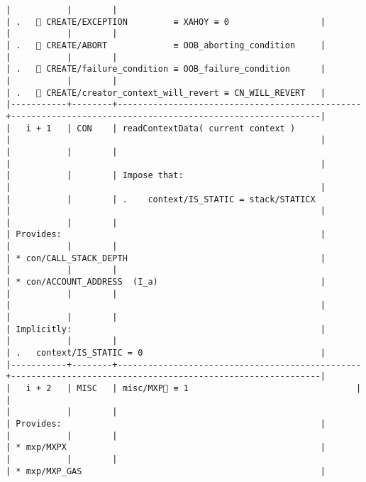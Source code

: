 \documentclass[varwidth=\maxdimen,margin=0.5cm,multi={verbatim}]{standalone}
\begin{document}
\begin{verbatim}
|           |        |                                                | .    CREATE/EXCEPTION         ≡ XAHOY ≡ 0                  |
|           |        |                                                | .    CREATE/ABORT             ≡ OOB_aborting_condition     |
|           |        |                                                | .    CREATE/failure_condition ≡ OOB_failure_condition      |
|           |        |                                                | .    CREATE/creator_context_will_revert ≡ CN_WILL_REVERT   |
|-----------+--------+------------------------------------------------+-------------------------------------------------------------|
|   i + 1   | CON    | readContextData( current context )             |                                                             |
|           |        |                                                |                                                             |
|           |        | Impose that:                                   |                                                             |
|           |        | .    context/IS_STATIC = stack/STATICX         |                                                             |
|           |        |                                                | Provides:                                                   |
|           |        |                                                | * con/CALL_STACK_DEPTH                                      |
|           |        |                                                | * con/ACCOUNT_ADDRESS  (I_a)                                |
|           |        |                                                |                                                             |
|           |        |                                                | Implicitly:                                                 |
|           |        |                                                | .   context/IS_STATIC = 0                                   |
|-----------+--------+------------------------------------------------+-------------------------------------------------------------|
|   i + 2   | MISC   | misc/MXP🚩 ≡ 1                                 |                                                             |
|           |        |                                                | Provides:                                                   |
|           |        |                                                | * mxp/MXPX                                                  |
|           |        |                                                | * mxp/MXP_GAS                                               |

\end{verbatim}
\end{document}
